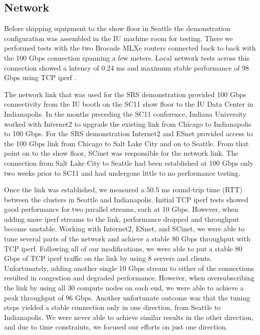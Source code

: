 \documentclass[]{sigplan-proc}
\begin{document}
\subsection{Network}\label{sec:network}

Before shipping equipment to the show floor in Seattle the demonstration configuration was assembled in the IU
machine room for testing.  There we performed tests with the two Brocade MLXe routers connected back to back
with the 100 Gbps connection spanning a few meters.  Local network tests across this connection showed a
latency of 0.24 ms and maximum stable performance of 98 Gbps using TCP iperf \cite{iperf2012}.

The network link that was used for the SRS demonstration provided 100 Gbps connectivity from the IU booth on
the SC11 show floor to the IU Data Center in Indianapolis. In the months preceding the SC11 conference,
Indiana University worked with Internet2 to upgrade the existing link from Chicago to Indianapolis to 100
Gbps. For the SRS demonstration Internet2 and ESnet provided access to the 100 Gbps link from Chicago to Salt
Lake City and on to Seattle. From that point on to the show floor, SCinet was responsible for the network
link. The connection from Salt Lake City to Seattle had been established at 100 Gbps only two weeks prior to
SC11 and had undergone little to no performance testing.

Once the link was established, we measured a 50.5 ms round-trip time (RTT) between the clusters in Seattle and
Indianapolis. Initial TCP iperf tests showed good performance for two parallel streams, each at 10
Gbps. However, when adding more iperf streams to the link, performance dropped and throughput become
unstable. Working with Internet2, ESnet, and SCinet, we were able to tune several parts of the network and
achieve a stable 80 Gbps throughput with TCP iperf. Following all of our modifications, we were able to put a
stable 80 Gbps of TCP iperf traffic on the link by using 8 servers and clients. Unfortunately, adding another
single 10 Gbps stream to either of the connections resulted in congestion and degraded performance. However,
when oversubscribing the link by using all 30 compute nodes on each end, we were able to achieve a peak
throughput of 96 Gbps. Another unfortunate outcome was that the tuning steps yielded a stable connection only
in one direction, from Seattle to Indianapolis. We were never able to achieve similar results in the other
direction, and due to time constraints, we focused our efforts on just one direction.
\end{document}
